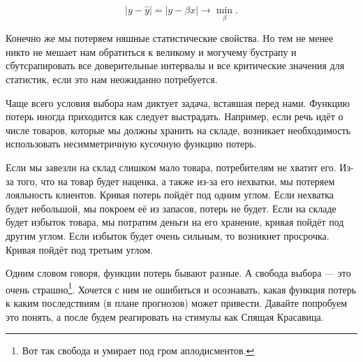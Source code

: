\documentclass[12pt, a4paper, oneside]{extreport}
\def \b{\beta}
\theoremstyle{plain}              %
\theoremstyle{definition}         %
\begin{document}
\[ |y - \hat y| = |y - \b x| \to \min_{\b}. \]

Конечно же мы потеряем няшные статистические свойства. Но тем не менее никто не мешает нам обратиться к великому и могучему бустрапу и сбутсрапировать все доверительные интервалы и все критические значения для статистик, если это нам неожиданно потребуется. 

Чаще всего условия выбора нам диктует задача, вставшая перед нами. Функцию потерь иногда приходится как следует выстрадать. Например, если речь идёт о числе товаров, которые мы должны хранить на складе, возникает необходимость использовать несимметричную кусочную функцию потерь.  

Если мы завезли на склад слишком мало товара, потребителям не хватит его. Из-за того, что на товар будет наценка, а также из-за его нехватки, мы потеряем лояльность клиентов. Кривая потерь пойдёт под одним углом. Если нехватка будет небольшой, мы покроем её из запасов, потерь не будет. Если на складе будет избыток товара, мы потратим деньги на его хранение, кривая пойдёт под другим углом. Если избыток будет очень сильным, то возникнет просрочка. Кривая пойдёт под третьим углом.  

\begin{center}
\end{center}


Одним словом говоря, функции потерь бывают разные. А свобода выбора --- это очень страшно\footnote{Вот так свобода и умирает под гром аплодисментов.}. Хочется с ним не ошибиться и осознавать, какая функция потерь к каким последствиям (в плане прогнозов) может привести.  Давайте попробуем это понять, а после будем реагировать на стимулы как Спящая Красавица. 
\end{document}
